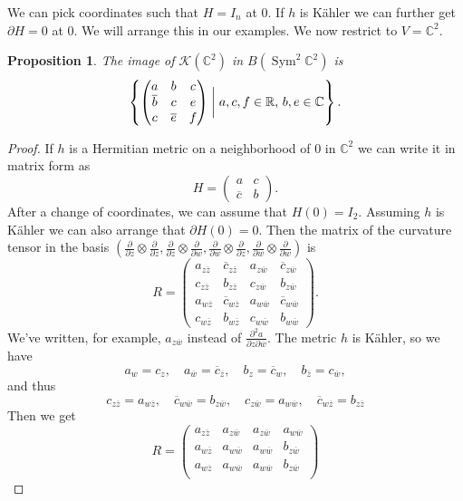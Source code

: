 \documentclass[10pt,a4paper]{amsart}
\newtheorem{prop}[theo]{Proposition}
\theoremstyle{definition}
\def\ov#1{\overline{#1}}
\newcommand{\kk}[1]{\mathbb{#1}}
\newcommand{\cc}[1]{\mathcal{#1}}
\DeclareMathOperator{\Sym}{Sym}
\begin{document}
We can pick coordinates such that $H = I_n$ at $0$.
If $h$ is K\"ahler we can further get $\partial H = 0$ at $0$.
We will arrange this in our examples.
We now restrict to $V = \kk C^2$.

\begin{prop}
The image of $\cc K(\kk C^2)$ in $B(\Sym^2 \kk C^2)$ is
$$
\left\{
\begin{pmatrix}
a & b & c
\\
\ov b & c & e
\\
c & \ov e & f
\end{pmatrix}
\biggm|
\text{$a, c, f \in \kk R$, $b, e \in \kk C$}
\right\}.
$$
\end{prop}


\begin{proof}
If $h$ is a Hermitian metric on a neighborhood of $0$ in $\kk C^2$
we can write it in matrix form as
$$
H = \begin{pmatrix}
a & c
\\
\ov c & b
\end{pmatrix}.
$$
After a change of coordinates, we can assume that $H(0) = I_2$.
Assuming $h$ is K\"ahler we can also arrange that $\partial H(0) = 0$.
Then the matrix of the curvature tensor in the basis
\def\tg#1#2{\frac{\partial}{\partial #1} \otimes \frac{\partial}{\partial #2}}
$(\tg zz, \tg zw, \tg wz, \tg ww)$
is
$$
R = \begin{pmatrix}
a_{z \ov z} & \ov c_{z \ov z} & a_{z \ov w} & \ov c_{z \ov w}
\\
c_{z \ov z} & b_{z \ov z} & c_{z \ov w} & b_{z \ov w}
\\
a_{w \ov z} & \ov c_{w \ov z} & a_{w \ov w} & \ov c_{w \ov w}
\\
c_{w \ov z} & b_{w \ov z} & c_{w \ov w} & b_{w \ov w}
\end{pmatrix}.
$$
We've written, for example, $a_{z \ov w}$ instead of $\frac{\partial^2 a}{\partial z \partial \ov w}$.
The metric $h$ is K\"ahler, so we have
$$
a_w = c_{z},
\quad
a_{\ov w} = \ov c_{\ov z},
\quad
b_z = \ov c_w,
\quad
b_{\ov z} = c_{\ov w},
$$
and thus
$$
c_{z \ov z} = a_{w \ov z},
\quad
\ov c_{w \ov w} = b_{z \ov w},
\quad
c_{z \ov w} = a_{w \ov w},
\quad
\ov c_{w \ov z} = b_{z \ov z}
$$
Then we get
$$
R = \begin{pmatrix}
a_{z \ov z} & a_{z \ov w} & a_{z \ov w} & a_{w \ov w}
\\
a_{w \ov z} & a_{w \ov w} & a_{w \ov w} & b_{z \ov w}
\\
a_{w \ov z} & a_{w \ov w} & a_{w \ov w} & b_{z \ov w}
\\

\end{pmatrix}$$
\end{proof}
\end{document}
